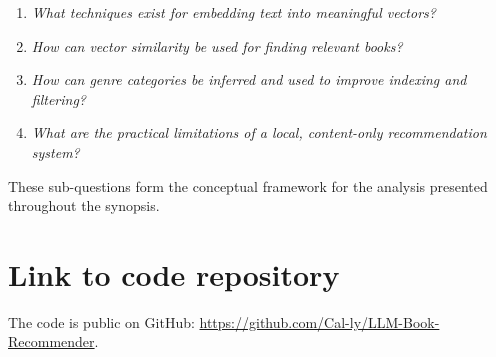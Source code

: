 \begin{enumerate}
    \item \label{itm:subq-embedding} \textit{What techniques exist for embedding text into meaningful vectors?}
    \item \label{itm:subq-similarity} \textit{How can vector similarity be used for finding relevant books?}
    \item \label{itm:subq-classification} \textit{How can genre categories be inferred and used to improve indexing and filtering?}
    \item \label{itm:subq-limitations} \textit{What are the practical limitations of a local, content-only recommendation system?}
\end{enumerate}

These sub-questions form the conceptual framework for the analysis presented throughout the synopsis.

\section{Link to code repository}
The code is public on GitHub: \url{https://github.com/Cal-ly/LLM-Book-Recommender}.

